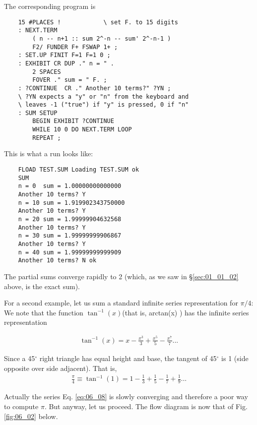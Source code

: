 The corresponding program is

\begin{lstlisting}
    15 #PLACES !            \ set F. to 15 digits
    : NEXT.TERM
        ( n -- n+1 :: sum 2^-n -- sum' 2^-n-1 )
        F2/ FUNDER F+ FSWAP 1+ ;
    : SET.UP FINIT F=1 F=1 0 ;
    : EXHIBIT CR DUP ." n = " .
        2 SPACES
        FOVER ." sum = " F. ;
    : ?CONTINUE  CR ." Another 10 terms?" ?YN ;
    \ ?YN expects a "y" or "n" from the keyboard and
    \ leaves -1 ("true") if "y" is pressed, 0 if "n"
    : SUM SETUP
        BEGIN EXHIBIT ?CONTINUE
        WHILE 10 0 DO NEXT.TERM LOOP
        REPEAT ;
\end{lstlisting}

This is what a run looks like:

\begin{lstlisting}
    FLOAD TEST.SUM Loading TEST.SUM ok
    SUM
    n = 0  sum = 1.00000000000000
    Another 10 terms? Y
    n = 10 sum = 1.919902343750000
    Another 10 terms? Y
    n = 20 sum = 1.99999904632568
    Another 10 terms? Y
    n = 30 sum = 1.99999999906867
    Another 10 terms? Y
    n = 40 sum = 1.99999999999909
    Another 10 terms? N ok
\end{lstlisting}

The partial sums converge rapidly to 2 (which, as we saw in \S \ref{sec:01_01_02} above, is the exact sum).

For a second example, let us sum a standard infinite series representation for $\pi/4$: We note that the function $\tan^{-1}(x)$(that is, arctan(x) ) has the infinite series representation

\begin{align}
    \tan^{-1}(x) = x - \frac{x^{3}}{3} + \frac{x^{5}}{5} - \frac{x^{7}}{7} ...
    \label{eq:06_07}
\end{align}

Since a 45$^{\circ}$ right triangle has equal height and base, the tangent of 45$^{\circ}$ is 1 (side opposite over side adjacent). That is,
\begin{align}
    \frac{\pi}{4} \equiv \tan^{-1}(1) = 1 - \frac{1}{3} + \frac{1}{5} - \frac{1}{7} + \frac{1}{9}...
    \label{eq:06_08}
\end{align}

Actually the series Eq. \ref{eq:06_08} is slowly converging and therefore a poor way to compute $\pi$. But anyway, let us proceed. The flow diagram is now that of Fig. \ref{fig:06_02} below.

